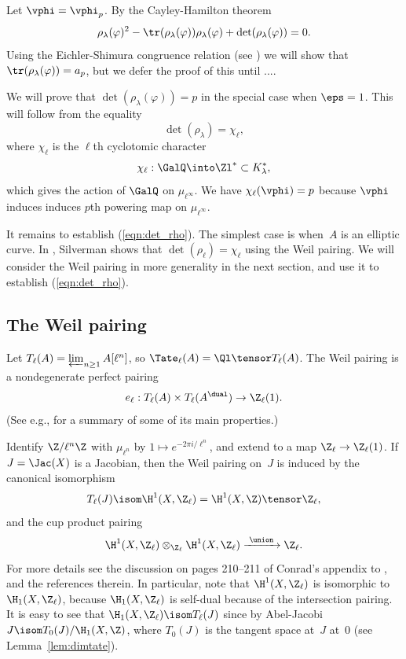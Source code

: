 \documentclass{report}
\begin{document}
Let $\vphi=\vphi_p$.  By the Cayley-Hamilton theorem
\[
\rho_{\lambda}(\varphi)^2
  -\tr(\rho_{\lambda}(\varphi))\rho_{\lambda}(\varphi)
  +\det(\rho_{\lambda}(\varphi))=0.
\]
Using the Eichler-Shimura
congruence relation (see ) we will show that
$\tr(\rho_{\lambda}(\varphi))=a_p$, but we defer the proof of
this until ....

We will prove that $\det(\rho_{\lambda}(\varphi))=p$ in the
special case when $\eps=1$. This will follow from the equality
\begin{equation}\label{eqn:det_rho}
  \det(\rho_{\lambda})=\chi_{\ell},
\end{equation}
where $\chi_{\ell}$ is the $\ell$th cyclotomic character
\[
 \chi_{\ell}:\GalQ\into\Zl^{*}\subset{}K_{\lambda}^{*},
\]
which gives the action of $\GalQ$ on $\mu_{\ell^\infty}$.
We have $\chi_{\ell}(\vphi)=p$ because $\vphi$ induces induces
$p$th powering map on $\mu_{\ell^\infty}$.

It remains to establish (\ref{eqn:det_rho}).
The simplest case is when~$A$ is an elliptic curve.
In \cite[]{silverman:aec}, Silverman shows that
$\det(\rho_{\ell})=\chi_{\ell}$ using the Weil pairing.
We will consider the Weil pairing in more generality in
the next section, and use it to establish (\ref{eqn:det_rho}).

\subsection{The Weil pairing}\label{sec:weil_pairing_a}
Let $T_\ell(A) = \varprojlim_{n\geq 1} A[\ell^n]$, so
$\Tate_{\ell}(A) = \Ql \tensor T_\ell(A)$.
The Weil pairing is a nondegenerate perfect pairing
\[
   e_\ell: T_{\ell}(A) \times T_{\ell}(A^{\dual}) \to \Z_\ell(1).
\]
(See e.g., \cite[\S16]{milne:abvars} for a summary of some
of its main properties.)
\begin{remark}
Identify $\Z/\ell^n\Z$ with $\mu_{\ell^n}$ by
$1\mapsto e^{-2\pi i/\ell^n}$, and extend to
a map $\Z_\ell\to \Z_\ell(1)$.
If $J=\Jac(X)$ is a Jacobian, then the Weil pairing on~$J$
is induced by the canonical isomorphism
\[
  T_\ell(J) \isom \H^1(X,\Z_\ell) = \H^1(X,\Z)\tensor\Z_\ell,
\]
and the cup product pairing
\[
    \H^1(X,\Z_\ell) \otimes_{\Z_\ell} \H^1(X,\Z_\ell)
        \xrightarrow{\,\,\union\,\,} \Z_\ell.
\]
For more details see the discussion on pages 210--211 of Conrad's
appendix to \cite{ribet-stein:serre}, and the references therein.  In
particular, note that $\H^1(X,\Z_\ell)$ is isomorphic to
$\H_1(X,\Z_\ell)$, because $\H_1(X,\Z_\ell)$ is self-dual because of
the intersection pairing.  It is easy to see that
$\H_1(X,\Z_\ell)\isom T_\ell(J)$ since by Abel-Jacobi $J\isom T_0(J)/\H_1(X,\Z)$,
where $T_0(J)$ is the tangent space at~$J$ at~$0$ (see Lemma~\ref{lem:dimtate}).
\end{remark}
\end{document}

